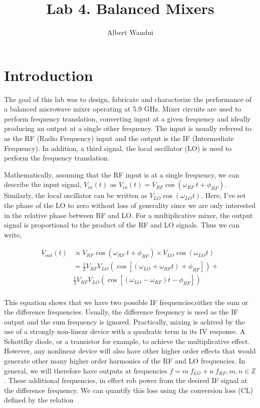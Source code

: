 \documentclass[twocolumn, aps, floatfix]{revtex4-1}
\begin{document}
\title{Lab 4. Balanced Mixers }
\author{Albert Wandui}
\maketitle

\section*{Introduction}\label{sec:introduction}

The goal of this lab was to design, fabricate and characterize the performance of a balanced microwave mixer operating at 5.9 GHz. Mixer circuits are used to perform frequency translation, converting input at a given frequency and ideally producing an output at a single other frequency. The input is usually referred to as the RF (Radio Frequency) input and the output is the IF (Intermediate Frequency). In addition, a third signal, the local oscillator (LO) is used to perform the frequency translation. 

Mathematically, assuming that the RF input is at a single frequency, we can describe the input signal, $V_{in}(t)$ as $V_{in}(t) = V_{RF} \cos\left(\omega_{RF}\ t + \phi_{RF} \right)$. Similarly, the local oscillator can be written as $V_{LO}\cos \left(\omega_{LO} t \right)$. Here, I've set the phase of the LO to zero without loss of generality since we are only interested in the relative phase between RF and LO. For a multiplicative mixer, the output signal is proportional to the product of the RF and LO signals. Thus we can write,

\begin{align*}
    V_{out}(t) & \propto V_{RF} \cos\left(\omega_{RF}\ t + \phi_{RF} \right) \times V_{LO}\cos \left(\omega_{LO} t \right)\\
    &= \frac{1}{2}  V_{RF}V_{LO} \left( \cos \left[\left(\omega_{LO} + \omega_{RF} t \right)+ \phi_{RF} \right]  \right) + \\ 
     & \frac{1}{2}  V_{RF}V_{LO}\left(  \cos \left[\left(\omega_{LO} - \omega_{RF} \right) t - \phi_{RF} \right] \right) \\
\end{align*}

This equation shows that we have two possible IF frequencies;either the sum or the difference frequencies. Usually, the difference frequency is used as the IF output and the sum frequency is ignored. Practically, mixing is achived by the use of a strongly non-linear device with a quadratic term in its IV response. A Schottlky diode, or a transistor for example, to achieve the multiplicative effect. However, any nonlinear device will also have other higher order effects that would generate other many higher order harmonics of the RF and LO frequencies. In general, we will therefore have outputs at frequencies $f = m\ f_{LO} + n\ f_{RF}, m, n \in \mathbb{Z}$. These additional frequencies, in effect rob power from the desired IF signal at the difference frequency. We can quantify this loss using the conversion loss (CL) defined by the relation 
\end{document}
